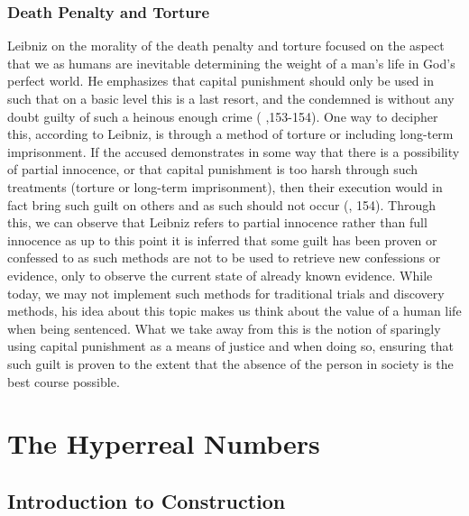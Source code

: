 \documentclass[12pt]{report}
\begin{document}
\section*{Death Penalty and Torture}
Leibniz on the morality of the death penalty and torture focused on the aspect that we as humans are inevitable determining the weight of a man's life in God's perfect world.
He emphasizes that capital punishment should only be used in such that on a basic level this is a last resort, and the condemned is without any doubt guilty of such a heinous enough crime ( ,153-154).
One way to decipher this, according to Leibniz, is through a method of torture or including long-term imprisonment.
If the accused demonstrates in some way that there is a possibility of partial innocence, or that capital punishment is too harsh through such treatments (torture or long-term imprisonment), then their execution would in fact bring such guilt on others and as such should not occur (, 154).
Through this, we can observe that Leibniz refers to partial innocence rather than full innocence as up to this point it is inferred that some guilt has been proven or confessed to as such methods are not to be used to retrieve new confessions or evidence, only to observe the current state of already known evidence.
While today, we may not implement such methods for traditional trials and discovery methods, his idea about this topic makes us think about the value of a human life when being sentenced.
What we take away from this is the notion of sparingly using capital punishment as a means of justice and when doing so, ensuring that such guilt is proven to the extent that the absence of the person in society is the best course possible.
\newpage



\part{The Hyperreal Numbers}
\newpage
\chapter{Introduction to Construction}
\end{document}
